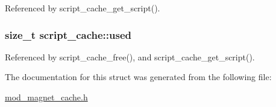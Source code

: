 Referenced by script\-\_\-cache\-\_\-get\-\_\-script().

\hypertarget{structscript__cache_a3b665d42fed0b698e9e617128baf3fd3}{
\subsubsection[{used}]{\setlength{\rightskip}{0pt plus 5cm}size\-\_\-t script\-\_\-cache\-::used}}\label{structscript__cache_a3b665d42fed0b698e9e617128baf3fd3}


Referenced by script\-\_\-cache\-\_\-free(), and script\-\_\-cache\-\_\-get\-\_\-script().



The documentation for this struct was generated from the following file\-:\begin{DoxyCompactItemize}
\item 
\hyperlink{mod__magnet__cache_8h}{mod\-\_\-magnet\-\_\-cache.\-h}\end{DoxyCompactItemize}
